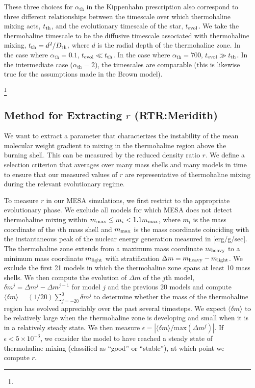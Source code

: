 These three choices for $\alpha_{\text{th}}$ in the Kippenhahn prescription also correspond to three different relationships between the timescale over which thermohaline mixing acts, $t_{\rm th}$, and the evolutionary timescale of the star, $t_{\rm{evol}}$. 
We take the thermohaline timescale to be the diffusive timescale associated with thermohaline mixing, $t_{\rm th} = d^2/D_{\rm th}$, where $d$ is the radial depth of the thermohaline zone.
In the case where $\alpha_{\text{th}} = 0.1$, 
$t_{\rm evol} \ll t_{\rm th}$. In the case where $\alpha_{\text{th}} = 700$, 
$t_{\rm evol} \gg t_{\rm th}$. In the intermediate case ($\alpha_{\text{th}}= 2$), the timescales are comparable (this is likewise true for the assumptions made in the Brown model).

\footnote{}

\subsection{Method for Extracting $r$ \textbf{(RTR:Meridith)}}
%
We want to extract a parameter that characterizes the instability of the mean molecular weight gradient to mixing in the thermohaline region above the burning shell. This can be measured by the reduced density ratio $r$.
We define a selection criterion that averages over many mass shells and many models in time to ensure that our measured values of $r$ are representative of thermohaline mixing during the relevant evolutionary regime.

To measure $r$ in our MESA simulations, we first restrict to the appropriate evolutionary phase. We exclude all models for which MESA does not detect thermohaline mixing within $m_{\rm max} \leq m_i < 1.1 m_{\rm max}$, where $m_i$ is the mass coordinate of the $i$th mass shell and $m_{\rm max}$ is the mass coordinate coinciding with the instantaneous peak of the nuclear energy generation measured in [erg/g/sec].
The thermohaline zone extends from a maximum mass coordinate $m_{\rm heavy}$ to a minimum mass coordinate $m_{\rm light}$ with stratification $\Delta m = m_{\rm heavy} - m_{\rm light}$.
We exclude the first 21 models in which the thermohaline zone spans at least 10 mass shells.
We then compute the evolution of $\Delta m$ of the $j$th model, $\delta m^j = \Delta m^{j} - \Delta m^{j-1}$ for model $j$ and the previous 20 models and compute $\langle \delta m \rangle = (1/20)\sum_{j=-20}^0 \delta m^j$ to determine whether the mass of the thermohaline region has evolved appreciably over the past several timesteps. We expect $\langle \delta m \rangle$ to be relatively large when the thermohaline zone is developing and small when it is in a relatively steady state.
We then measure $\epsilon = |\langle \delta m \rangle / \mathrm{max}(\Delta m^j)|$. If $\epsilon < 5 \times 10^{-3}$, we consider the model to have reached a steady state of thermohaline mixing (classified as ``good'' or ``stable''), at which point we compute $r$.

